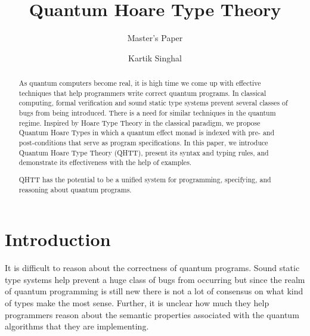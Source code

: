\documentclass[acmsmall,nonacm,timestamp,review=false,anonymous=false]{acmart}
\title{Quantum Hoare Type Theory}
\subtitle{Master's Paper}
\author{Kartik Singhal}
\affiliation{
	\position{PhD Student}
	\department{Department of Computer Science}
	\institution{University of Chicago}
	\city{Chicago}
	\state{IL}
	\country{USA}}
\begin{document}
\begin{abstract}
	As quantum computers become real, it is high time we come up with effective techniques that help programmers write correct quantum programs.
	In classical computing, formal verification and sound static type systems prevent several classes of bugs from being introduced. There is a need for similar techniques in the quantum regime.
	Inspired by Hoare Type Theory in the classical paradigm, we propose Quantum Hoare Types in which a quantum effect monad is indexed with pre- and post-conditions that serve as program specifications.
	In this paper, we introduce Quantum Hoare Type Theory (QHTT), present its syntax and typing rules, and demonstrate its effectiveness with the help of examples.

	QHTT has the potential to be a unified system for programming, specifying, and reasoning about quantum programs.
\end{abstract}

\maketitle

\tableofcontents



\section{Introduction}
It is difficult to reason about the correctness of quantum programs. Sound static type systems help prevent a huge class of bugs from occurring but since the realm of quantum programming is still new there is not a lot of consensus on what kind of types make the most sense. Further, it is unclear how much they help programmers reason about the semantic properties associated with the quantum algorithms that they are implementing.
\end{document}
